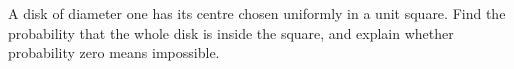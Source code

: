 A disk of diameter one has its centre chosen uniformly in a unit square. Find the probability that the whole disk is inside the square, and explain whether probability zero means impossible.
